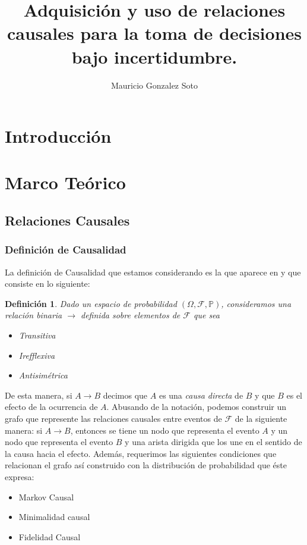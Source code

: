 \documentclass[11pt]{article}
\title{Adquisición y uso de relaciones causales para la toma de decisiones bajo incertidumbre.}
\author{Mauricio Gonzalez Soto}
\theoremstyle{plain}
\newtheorem{defi}[teo]{Definición}
\begin{document}
\maketitle
\section{Introducción}

\section{Marco Teórico}
	\subsection{Relaciones Causales}
		\subsubsection{Definición de Causalidad}
		La definición de Causalidad que estamos considerando es la que aparece en \cite{spirtes2000causation} y que consiste en lo siguiente:
		\begin{defi}
		Dado un espacio de probabilidad $(\Omega, \mathcal{F},\mathbb{P})$, consideramos una relación binaria $\to$ definida sobre elementos de $\mathcal{F}$ que sea
		\begin{itemize}
		\item Transitiva
		\item Irefflexiva
		\item Antisimétrica
		\end{itemize}
		\end{defi}
		De esta manera, si $A \to B$ decimos que $A$ es una \textit{causa directa} de $B$ y que $B$ es el efecto de la ocurrencia de $A$. Abusando de la notación, podemos construir un grafo que 	         represente las relaciones  causales entre eventos de $\mathcal{F}$ de la siguiente manera: si $A \to B$, entonces se tiene un nodo que representa el evento $A$ y un nodo que representa el evento $B$ y una arista dirigida que los une en el sentido de la causa hacia el efecto. Además, requerimos las siguientes condiciones que relacionan el grafo así construido con la distribución de probabilidad que éste expresa:
		\begin{itemize}
		\item Markov Causal
		\item Minimalidad causal
		\item Fidelidad Causal
		\end{itemize}
\end{document}
